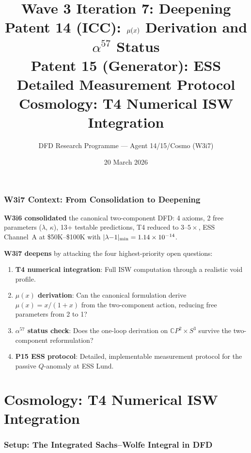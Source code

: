 \documentclass[11pt]{article}
\title{Wave 3 Iteration 7: Deepening\\
\large Patent 14 (ICC): $\mufd(x)$ Derivation and $\alpha^{57}$ Status\\
Patent 15 (Generator): ESS Detailed Measurement Protocol\\
Cosmology: T4 Numerical ISW Integration}
\author{DFD Research Programme --- Agent 14/15/Cosmo (W3i7)}
\date{20 March 2026}
\newcommand{\ee}[1]{\times 10^{#1}}
\newcommand{\lamdiff}{|\lambda{-}1|}
\newcommand{\mufd}{\mu}
\newcommand{\CP}{\mathbb{C}P}
\begin{document}
\maketitle
\tableofcontents
\newpage

\section*{W3i7 Context: From Consolidation to Deepening}

\noindent\textbf{W3i6 consolidated} the canonical two-component DFD:
4 axioms, 2 free parameters ($\lambda$, $\kappa$), 13+ testable predictions,
T4 reduced to $3$--$5\times$, ESS Channel~A at \$50K--\$100K with
$\lamdiff_{\rm min} = 1.14\ee{-14}$.

\noindent\textbf{W3i7 deepens} by attacking the four highest-priority
open questions:
\begin{enumerate}[nosep]
\item \textbf{T4 numerical integration}: Full ISW computation through
  a realistic void profile.
\item \textbf{$\mufd(x)$ derivation}: Can the canonical formulation
  derive $\mufd(x) = x/(1+x)$ from the two-component action, reducing
  free parameters from 2 to 1?
\item \textbf{$\alpha^{57}$ status check}: Does the one-loop derivation
  on $\CP^2 \times S^3$ survive the two-component reformulation?
\item \textbf{P15 ESS protocol}: Detailed, implementable measurement
  protocol for the passive $Q$-anomaly at ESS Lund.
\end{enumerate}


\part{Cosmology: T4 Numerical ISW Integration}
\label{part:T4}

\section{Setup: The Integrated Sachs--Wolfe Integral in DFD}
\label{sec:isw-setup}
\end{document}
